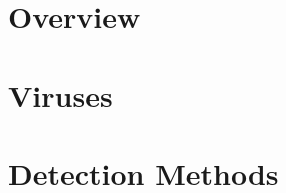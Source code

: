 \label{chapter:hardwareSecurity}

\newlength{\savedunitlength}
\setlength{\unitlength}{2em}

\section{Overview}
\section{Viruses}
\section{Detection Methods}

\setlength{\unitlength}{\savedunitlength}
